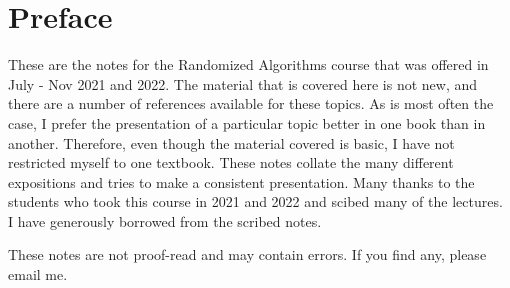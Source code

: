 \chapter*{Preface}

These are the notes for the Randomized Algorithms course that was offered in
July - Nov 2021 and 2022. The material that is covered here is not new, and
there are a number of references available for these topics. As is most often
the case, I prefer the presentation of a particular topic better in one book
than in another. Therefore, even though the material covered is basic, I have
not restricted myself to one textbook. These notes collate the many different
expositions and tries to make a consistent presentation. Many thanks to the
students who took this course in 2021 and 2022 and scibed many of the
lectures. I have generously borrowed from the scribed notes.

These notes are not proof-read and may contain errors. If you find any, please
email me.
